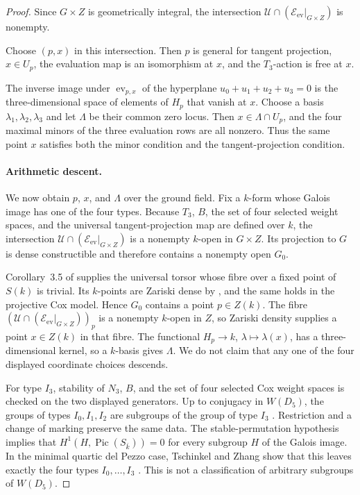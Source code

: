 \documentclass[11pt]{article}
\theoremstyle{remark}
\newcommand{\Pic}{\operatorname{Pic}}
\begin{document}
\begin{proof}
Since \(G\times Z\) is
geometrically integral, the intersection
\(\mathcal U\cap(\mathcal E_{\mathrm{ev}}|_{G\times Z})\) is nonempty.

Choose \((p,x)\) in this intersection.  Then \(p\) is general for tangent
projection, \(x\in U_p\), the evaluation map is an isomorphism at \(x\), and
the \(T_3\)-action is free at \(x\).

The inverse image under \(\operatorname{ev}_{p,x}\) of the hyperplane
\(u_0+u_1+u_2+u_3=0\) is the three-dimensional space of elements of \(H_p\)
that vanish at \(x\).  Choose a basis
\(\lambda_1,\lambda_2,\lambda_3\) and let \(\Lambda\) be their common zero
locus.  Then \(x\in\Lambda\cap U_p\), and the four maximal minors of the
three evaluation rows are all nonzero.  Thus the same point \(x\) satisfies
both the minor condition and the tangent-projection condition.

\paragraph{Arithmetic descent.}
We now obtain \(p\), \(x\), and \(\Lambda\) over the ground field.
Fix a \(k\)-form whose Galois image has one of the four types.
Because \(T_3\), \(B\), the set of four selected weight spaces, and the
universal tangent-projection map are defined over \(k\), the intersection
\(\mathcal U\cap(\mathcal E_{\mathrm{ev}}|_{G\times Z})\) is a nonempty
\(k\)-open in
\(G\times Z\).  Its projection to \(G\) is dense constructible and therefore
contains a nonempty open \(G_0\).

Corollary~3.5 of \cite{TZ} supplies the universal torsor whose fibre over a
fixed point of \(S(k)\) is trivial.  Its \(k\)-points are Zariski dense by
\cite[Lemma~2.1]{TZ}, and the same holds in the projective Cox model.  Hence
\(G_0\) contains a point \(p\in Z(k)\).  The fibre
\((\mathcal U\cap(\mathcal E_{\mathrm{ev}}|_{G\times Z}))_p\) is a nonempty
\(k\)-open in
\(Z\), so Zariski density supplies a point \(x\in Z(k)\) in that fibre.
The functional \(H_p\to k\), \(\lambda\mapsto\lambda(x)\), has a
three-dimensional kernel, so a \(k\)-basis gives \(\Lambda\).  We do not
claim that any one of the four displayed coordinate choices descends.

For type \(I_3\), stability of \(N_3\), \(B\), and the set of four selected
Cox weight spaces is checked on the two displayed generators.  Up to conjugacy in
\(W(D_5)\), the groups of types \(I_0,I_1,I_2\) are subgroups of the group of
type \(I_3\) \cite[Lemma~4.2]{TZ}.  Restriction and a change of marking
preserve the same data.  The stable-permutation hypothesis implies that
\(H^1(H,\Pic(S_{\bar k}))=0\) for every subgroup \(H\) of the Galois image.
In the minimal quartic del Pezzo case, Tschinkel and Zhang show that this
leaves exactly the four types \(I_0,\ldots,I_3\)
\cite[Proposition~4.1 and Lemma~4.2]{TZ}.  This is not a classification of
arbitrary subgroups of \(W(D_5)\).
\end{proof}
\end{document}
